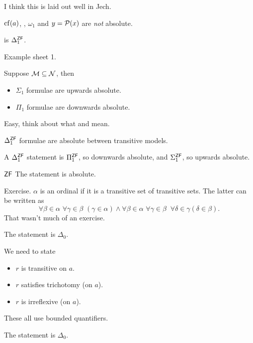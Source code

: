 \documentclass{article}
\begin{document}
\proof I think this is laid out well in Jech. \endproof
\begin{remark*}
    $\operatorname{cf}(a)$, , $\omega_{1}$ and $y = \mathcal{P}(x)$ are \textit{not} absolute.
\end{remark*}
\begin{fancylem}{}
     is $\Delta_{1}^{\mathsf{ZF}}$.
\end{fancylem}
\proof Example sheet 1. \endproof
\begin{fancyprop}{}
    Suppose $\mathcal{M} \subseteq \mathcal{N}$, then \begin{itemize}
        \item $\Sigma_{1}$ formulae are upwards absolute.
        \item $\Pi_{1}$ formulae are downwards absolute.
    \end{itemize}
\end{fancyprop}
\proof Easy, think about what \say{$\forall$} and \say{$\exists$} mean.
\begin{corr}{}
    $\Delta_{1}^{\mathsf{ZF}}$ formulae are absolute between transitive models.
\end{corr}
\proof A $\Delta_{1}^{\mathsf{ZF}}$ statement is $\Pi_{1}^{\mathsf{ZF}}$, so downwards absolute, and $\Sigma_{1}^{\mathsf{ZF}}$, so upwards absolute. \endproof
\begin{fancylem}{$\mathsf{ZF}$}
    The statement  is absolute.
\end{fancylem}
\proof Exercise. $\alpha$ is an ordinal if it is a transitive set of transitive sets. The latter can be written as \[ \forall \beta \in \alpha\,\, \forall \gamma \in \beta\,\,(\gamma \in \alpha) \wedge \forall \beta \in \alpha \,\, \forall \gamma \in \beta \,\,\ \forall \delta \in \gamma ( \delta \in \beta).\]
That wasn't much of an exercise.
\endproof
\begin{fancylem}{}
    The statement  is $\Delta_{0}$.
\end{fancylem}
\proof We need to state \begin{itemize}
    \item $r$ is transitive on $a$.
    \item $r$ satisfies trichotomy (on $a$).
    \item $r$ is irreflexive (on $a$).
\end{itemize}
These all use bounded quantifiers.
\endproof
\begin{corr}{}
    The statement  is $\Delta_{0}$.
\end{corr}
\end{document}
